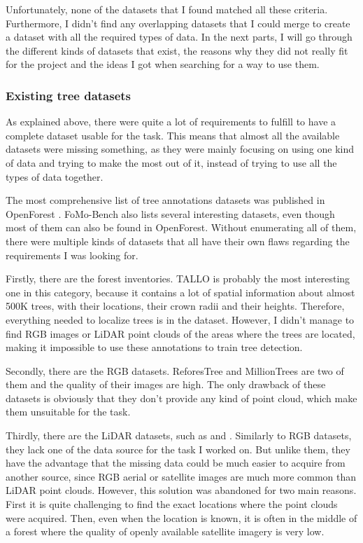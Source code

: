 \documentclass[
  letterpaper,
  DIV=11,
  numbers=noendperiod]{scrartcl}
\begin{document}
Unfortunately, none of the datasets that I found matched all these
criteria. Furthermore, I didn't find any overlapping datasets that I
could merge to create a dataset with all the required types of data. In
the next parts, I will go through the different kinds of datasets that
exist, the reasons why they did not really fit for the project and the
ideas I got when searching for a way to use them.

\subsubsection{Existing tree datasets}\label{existing-tree-datasets}

As explained above, there were quite a lot of requirements to fulfill to
have a complete dataset usable for the task. This means that almost all
the available datasets were missing something, as they were mainly
focusing on using one kind of data and trying to make the most out of
it, instead of trying to use all the types of data together.

The most comprehensive list of tree annotations datasets was published
in OpenForest \autocite{OpenForest}. FoMo-Bench \autocite{FoMo-Bench}
also lists several interesting datasets, even though most of them can
also be found in OpenForest. Without enumerating all of them, there were
multiple kinds of datasets that all have their own flaws regarding the
requirements I was looking for.

Firstly, there are the forest inventories. TALLO \autocite{TALLO} is
probably the most interesting one in this category, because it contains
a lot of spatial information about almost 500K trees, with their
locations, their crown radii and their heights. Therefore, everything
needed to localize trees is in the dataset. However, I didn't manage to
find RGB images or LiDAR point clouds of the areas where the trees are
located, making it impossible to use these annotations to train tree
detection.

Secondly, there are the RGB datasets. ReforesTree \autocite{ReforesTree}
and MillionTrees \autocite{MillionTrees} are two of them and the quality
of their images are high. The only drawback of these datasets is
obviously that they don't provide any kind of point cloud, which make
them unsuitable for the task.

Thirdly, there are the LiDAR datasets, such as \autocite{WildForest3D}
and \autocite{FOR-instance}. Similarly to RGB datasets, they lack one of
the data source for the task I worked on. But unlike them, they have the
advantage that the missing data could be much easier to acquire from
another source, since RGB aerial or satellite images are much more
common than LiDAR point clouds. However, this solution was abandoned for
two main reasons. First it is quite challenging to find the exact
locations where the point clouds were acquired. Then, even when the
location is known, it is often in the middle of a forest where the
quality of openly available satellite imagery is very low.
\end{document}
